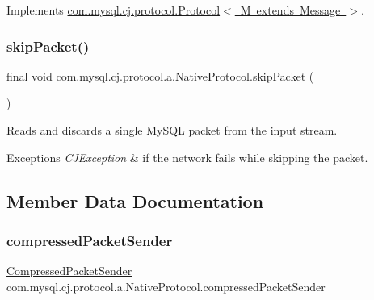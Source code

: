Implements \mbox{\hyperlink{interfacecom_1_1mysql_1_1cj_1_1protocol_1_1_protocol_ace5604859b8b79df6dcf91bee7c1cc6c}{com.\+mysql.\+cj.\+protocol.\+Protocol$<$ M extends Message $>$}}.

\mbox{\label{classcom_1_1mysql_1_1cj_1_1protocol_1_1a_1_1_native_protocol_ab344b89498bf035e0e8381f5999f1ead}} 
\subsubsection{\texorpdfstring{skip\+Packet()}{skipPacket()}}
{\footnotesize\ttfamily final void com.\+mysql.\+cj.\+protocol.\+a.\+Native\+Protocol.\+skip\+Packet (\begin{DoxyParamCaption}{ }\end{DoxyParamCaption})}

Reads and discards a single My\+S\+QL packet from the input stream.


\begin{DoxyExceptions}{Exceptions}
{\em C\+J\+Exception} & if the network fails while skipping the packet. \\
\hline
\end{DoxyExceptions}


\subsection{Member Data Documentation}
\mbox{\label{classcom_1_1mysql_1_1cj_1_1protocol_1_1a_1_1_native_protocol_a3fa25ff62eafecd246c6c47258a7ae80}} 
\subsubsection{\texorpdfstring{compressed\+Packet\+Sender}{compressedPacketSender}}
{\footnotesize\ttfamily \mbox{\hyperlink{classcom_1_1mysql_1_1cj_1_1protocol_1_1a_1_1_compressed_packet_sender}{Compressed\+Packet\+Sender}} com.\+mysql.\+cj.\+protocol.\+a.\+Native\+Protocol.\+compressed\+Packet\+Sender\hspace{0.3cm}{\ttfamily [protected]}}

